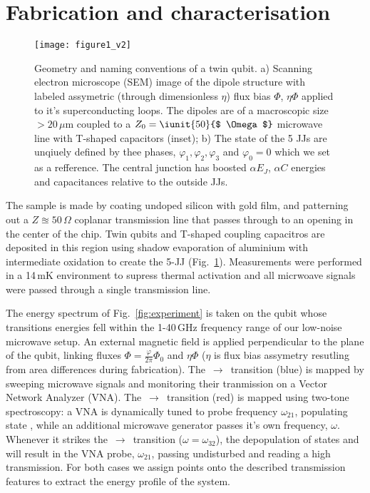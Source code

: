 \section{Fabrication and characterisation}
 \begin{figure}[h!]
 	\texttt{[image: figure1\_v2]}
 	\caption{\small Geometry and naming conventions of a twin qubit. a) Scanning electron microscope (SEM) image of the dipole structure with labeled assymetric (through dimensionless $ \eta $) flux bias  $ \Phi $, $ \eta\Phi $ applied to it's superconducting loops. The dipoles are of a macroscopic size $ > 20\,\mu $m coupled to a $ Z_0 = \iunit{50}{$ \Omega $} $ microwave line with T-shaped capacitors (inset); b) The state of the 5 JJs are unqiuely defined by thee phases, $ \varphi_{1}, \varphi_{2}, \varphi_{3}$ and $ \varphi_0 = 0$ which we set as a refference. The central junction has boosted $ \alpha E_J $, $ \alpha C $ energies and capacitances relative to the outside JJs.}
 	\label{fig:setup}
 \end{figure}
 
 \noindent The sample is made by coating undoped silicon with gold film, and patterning out a $ Z \approxeq 50\,\Omega $ coplanar transmission line that passes through to an opening in the center of the chip. Twin qubits and T-shaped coupling capacitros are deposited in this region using shadow evaporation of aluminium with intermediate oxidation to create the 5-JJ (Fig.~\ref{fig:setup}). Measurements were performed in a 14\,mK environment to supress thermal activation and all micrwoave signals were passed through a single transmission line.
 
 The energy spectrum of Fig.~\ref{fig:experiment} is taken on the qubit whose transitions energies fell within the 1-40\,GHz frequency range of our low-noise microwave setup. An external magnetic field is applied perpendicular to the plane of the qubit, linking fluxes $ \Phi = \frac{\varphi}{2\pi}\Phi_0$ and $ \eta\Phi $ ($ \eta $ is flux bias assymetry resutling from area differences during fabrication). The
 $\,\rightarrow\,$ transition (blue) is mapped by sweeping microwave signals and monitoring their tranmission on a Vector Network Analyzer (VNA). The  $\,\rightarrow\,$ transition (red) is mapped using two-tone spectroscopy: a VNA is dynamically tuned to probe frequency $ \omega_{21} $, populating state , while an additional microwave generator passes it's own frequency, $ \omega $. Whenever it strikes the $ \,\rightarrow\,$ transition ($\omega = \omega_{32} $), the depopulation of states  and  will result in the VNA probe, $ \omega_{21} $, passing undisturbed and reading a high transmission. For both cases we assign points onto the described transmission features to extract the energy profile of the system.
 
